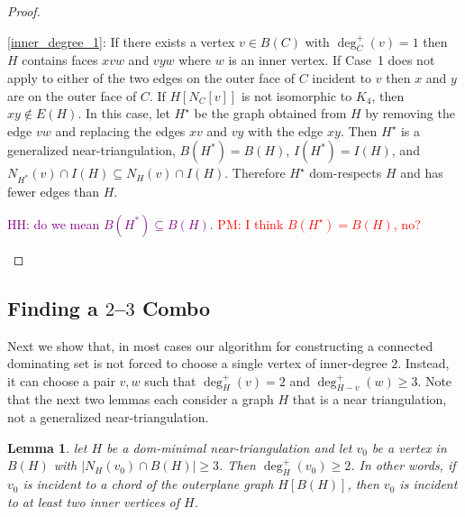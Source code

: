 \documentclass{article}
\newcommand{\pat}[1]{\textcolor{red}{PM: #1}}
\newcommand{\hussein}[1]{\textcolor{purple}{HH: #1}}
\newtheorem{lem}{Lemma}
\theoremstyle{definition}
\begin{document}
\begin{proof}
\begin{compactenum}
    \item \cref{inner_degree_1}: If there exists a vertex $v\in B(C)$ with $\deg^+_C(v)=1$ then $H$ contains faces $xvw$ and $vyw$ where $w$ is an inner vertex.  If Case~1 does not apply to either of the two edges on the outer face of $C$ incident to $v$ then $x$ and $y$ are on the outer face of $C$. If $H[N_C[v]]$ is not isomorphic to $K_4$, then $xy\not\in E(H)$.  In this case, let $H^\star$ be the graph obtained from $H$ by removing the edge $vw$ and replacing the edges $xv$ and $vy$ with the edge $xy$. Then $H^\star$ is a generalized near-triangulation, $B(H^*)=B(H)$, $I(H^*)=I(H)$, and $N_{H^*}(v)\cap I(H)\subseteq N_{H}(v)\cap I(H)$.  Therefore $H^\star$ dom-respects $H$ and has fewer edges than $H$. \qedhere

    \hussein{do we mean
    $B(H^*) \subseteq B(H)$.} \pat{I think $B(H^\star)=B(H)$, no?}
  \end{compactenum}
\end{proof}

\subsection{Finding a $2$--$3$ Combo}
\label{combo}

Next we show that, in most cases our algorithm for constructing a connected dominating set is not forced to choose a single vertex of inner-degree $2$. Instead, it can choose a pair $v,w$ such that $\deg^+_H(v)=2$ and $\deg^+_{H-v}(w)\ge 3$. Note that the next two lemmas each consider a graph $H$ that is a near triangulation, not a generalized near-triangulation.

\begin{lem}\label{chord_incident}
  let $H$ be a dom-minimal near-triangulation and let $v_0$ be a vertex in $B(H)$ with $|N_H(v_0)\cap B(H)|\ge 3$.  Then $\deg^+_H(v_0)\ge 2$.  In other words, if $v_0$ is incident to a chord of the outerplane graph $H[B(H)]$, then $v_0$ is incident to at least two inner vertices of $H$.
\end{lem}
\end{document}
